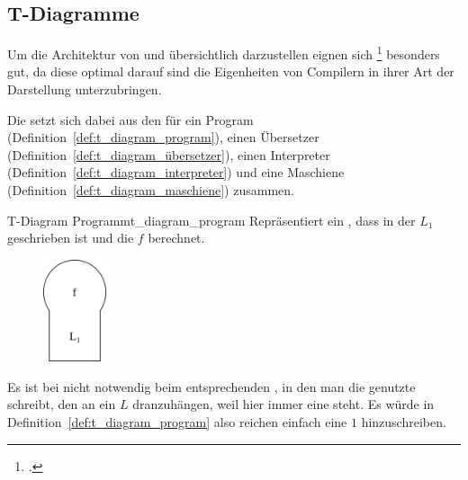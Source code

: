 
\subsection{T-Diagramme}
Um die Architektur von  und  übersichtlich darzustellen eignen sich \footcite{earley_formalism_1970} besonders gut, da diese optimal darauf  sind die Eigenheiten von Compilern in ihrer Art der Darstellung unterzubringen.

Die  setzt sich dabei aus den  für ein Program (Definition~\ref{def:t_diagram_program}), einen Übersetzer (Definition~\ref{def:t_diagram_übersetzer}), einen Interpreter (Definition~\ref{def:t_diagram_interpreter}) und eine Maschiene (Definition~\ref{def:t_diagram_maschiene}) zusammen.

\begin{Definition}{T-Diagram Programm}{t_diagram_program}
  Repräsentiert ein , dass in der  $L_1$ geschrieben ist und die  $f$ berechnet.
  \begin{figure}[H]
    \centering
    \includegraphics[height=3cm]{./figures/programm.png}
  \end{figure}
\end{Definition}

\begin{Special_Paragraph}
  Es ist bei  nicht notwendig beim entsprechenden , in den man die genutzte  schreibt, den  an ein $L$ dranzuhängen, weil hier immer eine  steht. Es würde in Definition~\ref{def:t_diagram_program} also reichen einfach eine $1$ hinzuschreiben.
\end{Special_Paragraph}

